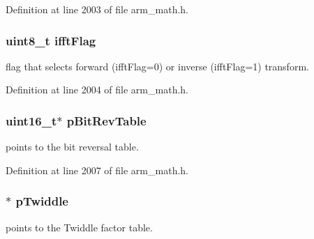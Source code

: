 Definition at line 2003 of file arm\+\_\+math.\+h.

\subsubsection[{\texorpdfstring{ifft\+Flag}{ifftFlag}}]{\setlength{\rightskip}{0pt plus 5cm}uint8\+\_\+t ifft\+Flag}\hypertarget{structarm__cfft__radix2__instance__q31_ad6ca6e223f986ebfd94c5ee1e410aa73}{}\label{structarm__cfft__radix2__instance__q31_ad6ca6e223f986ebfd94c5ee1e410aa73}
flag that selects forward (ifft\+Flag=0) or inverse (ifft\+Flag=1) transform. 

Definition at line 2004 of file arm\+\_\+math.\+h.

\subsubsection[{\texorpdfstring{p\+Bit\+Rev\+Table}{pBitRevTable}}]{\setlength{\rightskip}{0pt plus 5cm}uint16\+\_\+t$\ast$ p\+Bit\+Rev\+Table}\hypertarget{structarm__cfft__radix2__instance__q31_a46a2fb328199897af100fea0bfdf59aa}{}\label{structarm__cfft__radix2__instance__q31_a46a2fb328199897af100fea0bfdf59aa}
points to the bit reversal table. 

Definition at line 2007 of file arm\+\_\+math.\+h.

\subsubsection[{\texorpdfstring{p\+Twiddle}{pTwiddle}}]{$\ast$ p\+Twiddle}\hypertarget{structarm__cfft__radix2__instance__q31_a2505b7d5ec077b244c712797a5253b6d}{}\label{structarm__cfft__radix2__instance__q31_a2505b7d5ec077b244c712797a5253b6d}
points to the Twiddle factor table. 

